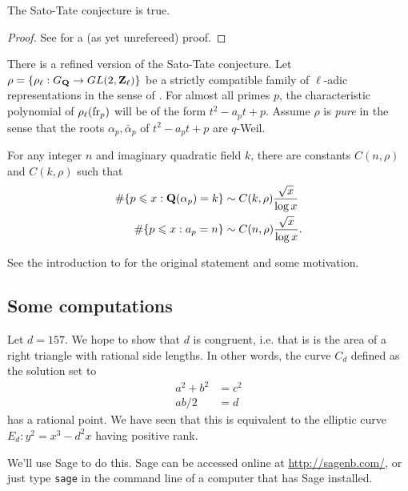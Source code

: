\begin{theorem}
The Sato-Tate conjecture is true. 
\end{theorem}
\begin{proof}
See \cite[8.3]{bght09} for a (as yet unrefereed) proof. 
\end{proof}

There is a refined version of the Sato-Tate conjecture. Let 
$\rho=\{\rho_\ell:G_{\mathbf{Q}} \to GL(2,\mathbf{Z}_\ell)\}$ be a strictly compatible family 
of $\ell$-adic representations in the sense of \cite[ch.1]{se68}. For almost 
all primes $p$, the characteristic polynomial of $\rho_\ell(\mathrm{fr}_p)$ will be 
of the form $t^2 - a_p t + p$. Assume $\rho$ is \emph{pure} in the sense that 
the roots $\alpha_p,\bar\alpha_p$ of $t^2-a_p t+p$ are $q$-Weil. 

\begin{conjecture}
For any integer $n$ and imaginary quadratic field $k$, there are constants 
$C(n,\rho)$ and $C(k,\rho)$ such that 
\begin{align*}
  \#\{ p\leqslant x : \mathbf{Q}(\alpha_p) = k\} &\sim C(k,\rho) \frac{\sqrt x}{\log x} \\
  \#\{p\leqslant x : a_p = n\} &\sim C(n,\rho) \frac{\sqrt x}{\log x} \text{.}
\end{align*}
\end{conjecture}

See the introduction to \cite{lt76} for the original statement and some 
motivation. 





\subsection{Some computations}

Let $d=157$. We hope to show that $d$ is congruent, i.e. that is is the area 
of a right triangle with rational side lengths. In other words, the curve 
$C_d$ defined as the solution set to 
\begin{align*}
  a^2+b^2 &= c^2 \\
  a b/2 &= d
\end{align*}
has a rational point. We have seen that this is equivalent to the elliptic 
curve $E_d:y^2=x^3-d^2 x$ having positive rank. 

We'll use Sage to do this. Sage can be accessed online at 
\url{http://sagenb.com/}, or just type \texttt{sage} in the command line of a 
computer that has Sage installed. 

